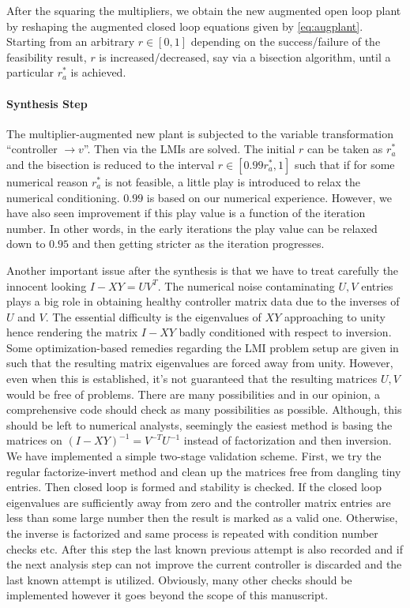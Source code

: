 After the squaring the multipliers, we obtain the new augmented open loop plant by reshaping the augmented closed
loop equations given by \eqref{eq:augplant}. Starting from an arbitrary $r\in[0,1]$ depending on the success/failure
of the feasibility result, $r$ is increased/decreased, say via a bisection algorithm, until a particular $r^*_a$ is 
achieved. 

\paragraph{Synthesis Step} The multiplier-augmented new plant is subjected to the variable transformation 
\enquote{controller $\to v$}. Then via  the LMIs are solved. The initial $r$ can 
be taken as $r^*_a$ and the bisection is reduced to the interval $r\in[0.99r^*_a,1]$ such that if for some numerical
reason $r^*_a$ is not feasible, a little play is introduced to relax the numerical conditioning. $0.99$ is based on our
numerical experience. However, we have also seen improvement if this play value is a function of the iteration number. 
In other words, in the early iterations the play value can be relaxed down to $0.95$ and then getting stricter as the 
iteration progresses.

Another important issue after the synthesis is that we have to treat carefully the innocent looking $I-XY = UV^T$. The
numerical noise contaminating $U,V$ entries plays a big role in obtaining healthy controller matrix data due to the 
inverses of $U$ and $V$. The essential difficulty is the eigenvalues of $XY$ approaching to unity hence rendering the 
matrix $I-XY$ badly conditioned with respect to inversion. Some optimization-based remedies regarding the LMI problem setup 
are given in \cite{lmibook99} such that the resulting matrix eigenvalues are forced away from unity. However, even when this is 
established, it's not guaranteed that the resulting matrices $U,V$ would be free of problems. There are many possibilities 
and in our opinion, a comprehensive code should check as many possibilities as possible. Although, this should be left 
to numerical analysts, seemingly the easiest method is basing the matrices on $(I-XY)^{-1}= V^{-T}U^{-1}$ instead of 
factorization and then inversion. We have implemented a simple two-stage validation scheme. First, we try the regular 
factorize-invert method and clean up the matrices free from dangling tiny entries. Then closed loop is formed and stability 
is checked. If the closed loop eigenvalues are sufficiently away from zero and the controller matrix entries are less than 
some large number then the result is marked as a valid one. Otherwise, the inverse is factorized and same process is repeated
with condition number checks etc. After this step the last known previous attempt is also recorded and if the next analysis 
step can not improve the current controller is discarded and the last known attempt is utilized. Obviously, many other checks 
should be implemented however it goes beyond the scope of this manuscript. 




